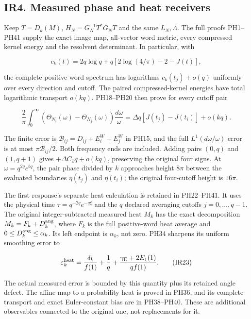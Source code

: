 \documentclass[10pt]{article}
\begin{document}
\subsection{IR4. Measured phase and heat receivers}\label{ir4.-measured-phase-and-heat-receivers}

Keep \(T=D_k(M)\), \(H_N=G_N^{-1}T^*G_NT\) and the same \(L_N,\Lambda\). The full proofs PH1--PH41 supply the exact image map, all-vector word metric, every compressed kernel energy and the resolvent determinant. In particular, with

\[
 c_k(t)=2q\log q+q[2\log(4/\pi)-2-J(t)],
\]

the complete positive word spectrum has logarithms \(c_k(t_j)+o(q)\) uniformly over every direction and cutoff. The paired compressed-kernel energies have total logarithmic transport \(o(kq)\). PH18--PH20 then prove for every cutoff pair

\[
 \frac2\pi\int_0^\infty(\Theta_{N_i}(\omega)-\Theta_{N_j}(\omega))\frac{d\omega}\omega
 =\Delta q[J(t_j)-J(t_i)]+o(kq).
 \tag{IR22}
\]

The finite error is \(\mathcal B_{ij}=D_{ij}+E_i^W+E_j^W\) in PH15, and the full \(L^1(d\omega/\omega)\) error is at most \(\pi\mathcal B_{ij}/2\). Both frequency ends are included. Adding pairs \((0,q)\) and \((1,q+1)\) gives \(+\Delta C_\partial q+o(kq)\), preserving the original four signs. At \(\omega=q^{2q}e^{bq}\), the pair phase divided by \(k\) approaches height \(8\pi\) between the evaluated boundaries \(\eta(t_j)\) and \(\eta(t_i)\); the original four-cutoff height is \(16\pi\).

The first response's separate heat calculation is retained in PH22--PH41. It uses the physical time \(\tau=q^{-2q}e^{-q\xi}\) and the \(q\) declared averaging cutoffs \(j=0,\ldots,q-1\). The original integer-subtracted measured heat \(M_k\) has the exact decomposition \(M_k=F_k+D_k^{\rm ang}\), where \(F_k\) is the full positive-word heat average and \(0\le D_k^{\rm ang}\le\alpha_k\). Its left endpoint is \(\alpha_k\), not zero. PH34 sharpens its uniform smoothing error to

\[
 \varepsilon_k^{\rm heat}=\frac{\delta_k}{f(1)}+\frac1q
 +\frac{\gamma_{\rm E}+2E_1(1)}{qf(1)}.
 \tag{IR23}
\]

The actual measured error is bounded by this quantity plus its retained angle defect. The affine map to a probability heat is proved in PH36, and its complete transport and exact Euler-constant bias are in PH38--PH40. These are additional observables connected to the original one, not replacements for it.
\end{document}

